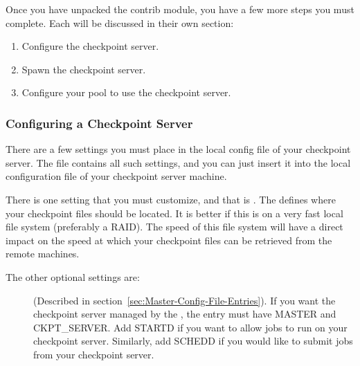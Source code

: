 Once you have unpacked the contrib module, you have a few more steps
you must complete.
Each will be discussed in their own section:
\begin{enumerate}
\item Configure the checkpoint server.
\item Spawn the checkpoint server.
\item Configure your pool to use the checkpoint server.
\end{enumerate}

\subsubsection{\label{sec:Configure-Ckpt-Server}
Configuring a Checkpoint Server} 

There are a few settings you must place in the local config file of
your checkpoint server.  
The file  contains
all such settings, and you can just insert it into the local
configuration file of your checkpoint server machine. 

There is one setting that you must customize, and that is
.  
\label{param:CkptServerDir}
The  defines where your checkpoint files
should be located. 
It is better if this is on a very fast local file system (preferably a
RAID). 
The speed of this file system will have a direct impact on the speed
at which your checkpoint files can be retrieved from the remote
machines. 

The other optional settings are:
\begin{description}

\item[] (Described in
section~\ref{sec:Master-Config-File-Entries}).  
If you want the checkpoint server managed by the , the
 entry must have MASTER and CKPT\_SERVER.
Add STARTD if you want to allow jobs to run on your checkpoint server.
Similarly, add SCHEDD if you would like to submit jobs from your
checkpoint server. 

\end{description}

